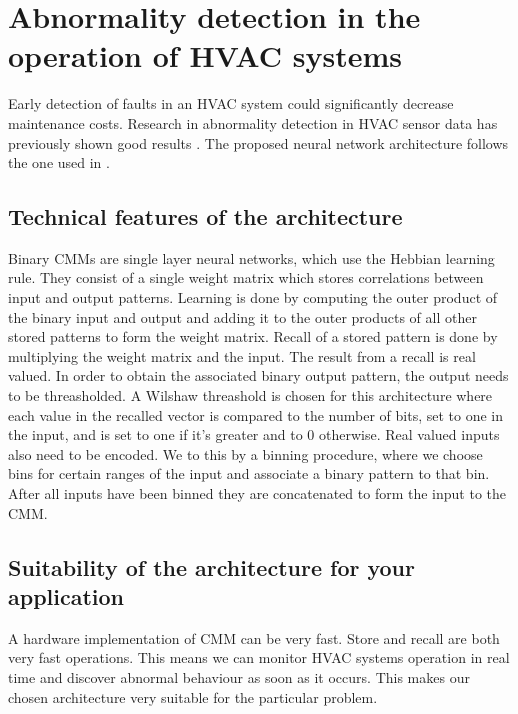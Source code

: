 \documentclass[a4paper, 11pt]{article}
\begin{document}
\section{Abnormality detection in the operation of HVAC systems}
Early detection of faults in an HVAC system could significantly decrease maintenance costs. Research in abnormality detection in HVAC sensor data has previously shown good results \cite{Narayanaswamy2014}. The proposed neural network architecture follows the one used in \cite{wrro89505}.
\subsection{Technical features of the architecture}

Binary CMMs are single layer neural networks, which use the Hebbian learning rule. They consist of a single weight matrix which stores correlations between input and output patterns. Learning is done by computing the outer product of the binary input and output and adding it to the outer products of all other stored patterns to form the weight matrix. Recall of a stored pattern is done by multiplying the weight matrix and the input. The result from a recall is real valued. In order to obtain the associated binary output pattern, the output needs to be threasholded. A Wilshaw threashold is chosen for this architecture where each value in the recalled vector is compared to the number of bits, set to one in the input, and is set to one if it's greater and to 0 otherwise. Real valued inputs also need to be encoded. We to this by a binning procedure, where we choose bins for certain ranges of the input and associate a binary pattern to that bin. After all inputs have been binned they are concatenated to form the input to the CMM. 
\subsection{Suitability of the architecture for your application}
A hardware implementation of CMM can be very fast. Store and recall are both very fast operations. This means we can monitor HVAC systems operation in real time and discover abnormal behaviour as soon as it occurs. This makes our chosen architecture very suitable for the particular problem.
\end{document}
